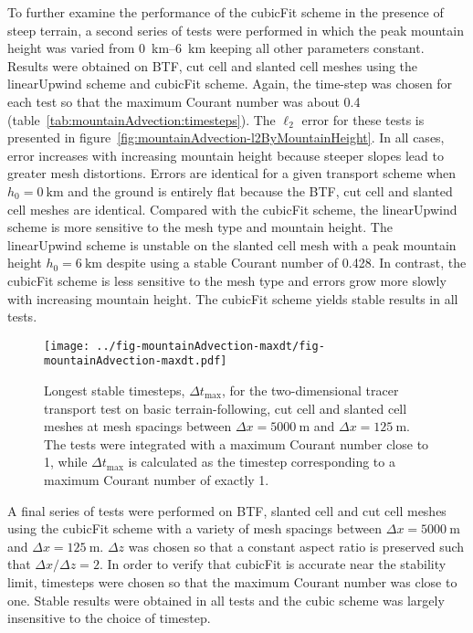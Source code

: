 To further examine the performance of the cubicFit scheme in the presence of steep terrain, a second series of tests were performed in which the peak mountain height was varied from \SIrange{0}{6}{\kilo\meter} keeping all other parameters constant.
Results were obtained on BTF, cut cell and slanted cell meshes using the linearUpwind scheme and cubicFit scheme.  Again, the time-step was chosen for each test so that the maximum Courant number was about \num{0.4} (table~\ref{tab:mountainAdvection:timesteps}).  The $\ell_2$ error for these tests is presented in figure~\ref{fig:mountainAdvection-l2ByMountainHeight}.
In all cases, error increases with increasing mountain height because steeper slopes lead to greater mesh distortions.
Errors are identical for a given transport scheme when $h_0 = \SI{0}{\kilo\meter}$ and the ground is entirely flat because the BTF, cut cell and slanted cell meshes are identical.
Compared with the cubicFit scheme, the linearUpwind scheme is more sensitive to the mesh type and mountain height.  The linearUpwind scheme is unstable on the slanted cell mesh with a peak mountain height $h_0 = \SI{6}{\kilo\meter}$ despite using a stable Courant number of \num{0.428}.
In contrast, the cubicFit scheme is less sensitive to the mesh type and errors grow more slowly with increasing mountain height.  The cubicFit scheme yields stable results in all tests.

\begin{figure}
	\centering
	\texttt{[image: ../fig-mountainAdvection-maxdt/fig-mountainAdvection-maxdt.pdf]}
	\caption{Longest stable timesteps, $\Delta t_\mathrm{max}$, for the two-dimensional tracer transport test on basic terrain-following, cut cell and slanted cell meshes at mesh spacings between $\Delta x = \SI{5000}{\meter}$ and $\Delta x = \SI{125}{\meter}$.  The tests were integrated with a maximum Courant number close to 1, while $\Delta t_\mathrm{max}$ is calculated as the timestep corresponding to a maximum Courant number of exactly 1.}
	\label{fig:mountainAdvection-maxdt}
\end{figure}

A final series of tests were performed on BTF, slanted cell and cut cell meshes using the cubicFit scheme with a variety of mesh spacings between $\Delta x = \SI{5000}{\meter}$ and $\Delta x = \SI{125}{\meter}$.  $\Delta z$ was chosen so that a constant aspect ratio is preserved such that $\Delta x / \Delta z = 2$.  In order to verify that cubicFit is accurate near the stability limit, timesteps were chosen so that the maximum Courant number was close to one.  Stable results were obtained in all tests and the cubic scheme was largely insensitive to the choice of timestep.

